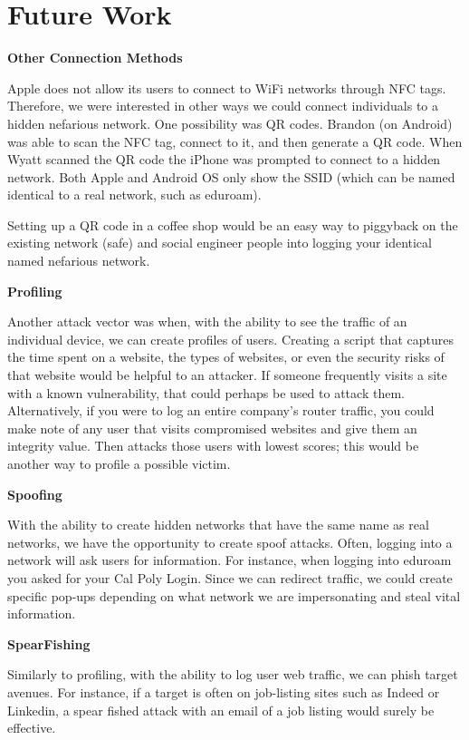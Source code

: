 \documentclass[sigconf]{acmart}
\begin{document}
\section{Future Work}
\textbf{Other Connection Methods}

Apple does not allow its users to connect to WiFi networks through NFC tags. Therefore, we were interested in other ways we could connect individuals to a hidden nefarious network. One possibility was QR codes. Brandon (on Android) was able to scan the NFC tag, connect to it, and then generate a QR code. When Wyatt scanned the QR code the iPhone was prompted to connect to a hidden network. Both Apple and Android OS only show the SSID (which can be named identical to a real network, such as eduroam).

Setting up a QR code in a coffee shop would be an easy way to piggyback on the existing network (safe) and social engineer people into logging your identical named nefarious network. 

\textbf{Profiling}

Another attack vector was when, with the ability to see the traffic of an individual device, we can create profiles of users. Creating a script that captures the time spent on a website, the types of websites, or even the security risks of that website would be helpful to an attacker. If someone frequently visits a site with a known vulnerability, that could perhaps be used to attack them. Alternatively, if you were to log an entire company's router traffic, you could make note of any user that visits compromised websites and give them an integrity value. Then attacks those users with lowest scores; this would be another way to profile a possible victim. 

\textbf{Spoofing}

With the ability to create hidden networks that have the same name as real networks, we have the opportunity to create spoof attacks. Often, logging into a network will ask users for information. For instance, when logging into eduroam you asked for your Cal Poly Login. Since we can redirect traffic, we could create specific pop-ups depending on what network we are impersonating and steal vital information.

\textbf{SpearFishing} 

Similarly to profiling, with the ability to log user web traffic, we can phish target avenues. For instance, if a target is often on job-listing sites such as Indeed or Linkedin, a spear fished attack with an email of a job listing would surely be effective. 
\end{document}
